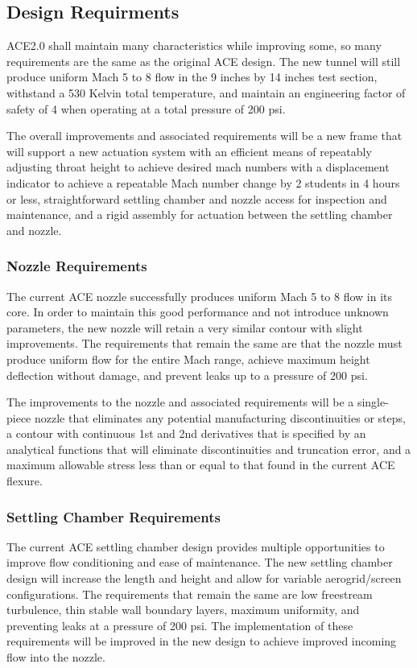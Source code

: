 \subsection{Design Requirments}

ACE2.0 shall maintain many characteristics while improving some, so many requirements are the same as the original ACE design. The new tunnel will still produce uniform Mach 5 to 8 flow in the 9 inches by 14 inches test section, withstand a 530 Kelvin total temperature, and maintain an engineering factor of safety of 4 when operating at a total pressure of 200 psi.

The overall improvements and associated requirements will be a new frame that will support a new actuation system with an efficient means of repeatably adjusting throat height to achieve desired mach numbers with a displacement indicator to achieve a repeatable Mach number change by 2 students in 4 hours or less, straightforward settling chamber and nozzle access for inspection and maintenance, and a rigid assembly for actuation between the settling chamber and nozzle.

\subsubsection*{Nozzle Requirements}

The current ACE nozzle successfully produces uniform Mach 5 to 8 flow in its core. In order to maintain this good performance and not introduce unknown parameters, the new nozzle will retain a very similar contour with slight improvements. The requirements that remain the same are that the nozzle must produce uniform flow for the entire Mach range, achieve maximum height deflection without damage, and prevent leaks up to a pressure of 200 psi.

The improvements to the nozzle and associated requirements will be a single-piece nozzle that eliminates any potential manufacturing discontinuities or steps, a contour with continuous 1st and 2nd derivatives that is specified by an analytical functions that will eliminate discontinuities and truncation error, and a maximum allowable stress less than or equal to that found in the current ACE flexure.

\subsubsection*{Settling Chamber Requirements}

The current ACE settling chamber design provides multiple opportunities to improve flow conditioning and ease of maintenance. The new settling chamber design will increase the length and height and allow for variable aerogrid/screen configurations. The requirements that remain the same are low freestream turbulence, thin stable wall boundary layers, maximum uniformity, and preventing leaks at a pressure of 200 psi. The implementation of these requirements will be improved in the new design to achieve improved incoming flow into the nozzle.

